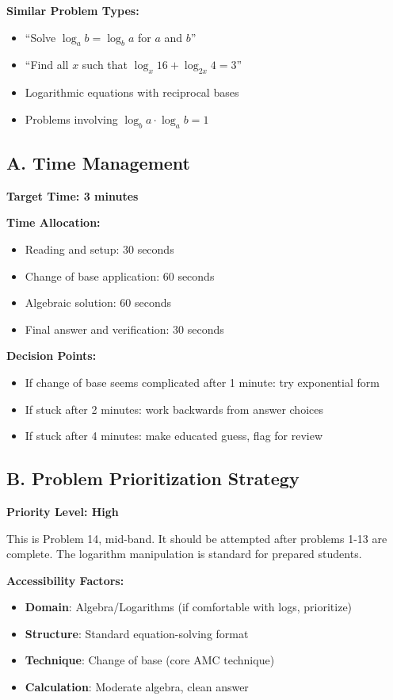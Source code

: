 \documentclass[12pt]{article}
\begin{document}
\textbf{Similar Problem Types:}
\begin{itemize}
    \item ``Solve $\log_a b = \log_b a$ for $a$ and $b$''
    \item ``Find all $x$ such that $\log_x 16 + \log_{2x} 4 = 3$''
    \item Logarithmic equations with reciprocal bases
    \item Problems involving $\log_b a \cdot \log_a b = 1$
\end{itemize}

\begin{competitionbox}
\subsection*{A. Time Management}

\textbf{Target Time: 3 minutes}

\textbf{Time Allocation:}
\begin{itemize}
    \item Reading and setup: 30 seconds
    \item Change of base application: 60 seconds
    \item Algebraic solution: 60 seconds
    \item Final answer and verification: 30 seconds
\end{itemize}

\textbf{Decision Points:}
\begin{itemize}
    \item If change of base seems complicated after 1 minute: try exponential form
    \item If stuck after 2 minutes: work backwards from answer choices
    \item If stuck after 4 minutes: make educated guess, flag for review
\end{itemize}

\subsection*{B. Problem Prioritization Strategy}

\textbf{Priority Level: High}

This is Problem 14, mid-band. It should be attempted after problems 1-13 are complete. The logarithm manipulation is standard for prepared students.

\textbf{Accessibility Factors:}
\begin{itemize}
    \item \textbf{Domain}: Algebra/Logarithms (if comfortable with logs, prioritize)
    \item \textbf{Structure}: Standard equation-solving format
    \item \textbf{Technique}: Change of base (core AMC technique)
    \item \textbf{Calculation}: Moderate algebra, clean answer
\end{itemize}


\end{competitionbox}
\end{document}
